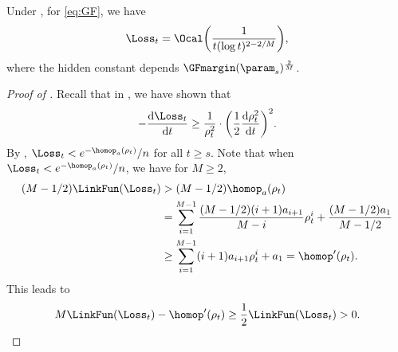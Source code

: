 \begin{lemma}
\label{lem:L-upperbound} 
Under , for \cref{eq:GF}, we have
\[
    \Loss_t = \Ocal \bigg( \frac{1}{t(\log t)^{2-2/M}} \bigg),
\]
where the hidden constant depends $\GFmargin(\param_s)^{\frac{2}{M}}$. 
\end{lemma}
\begin{proof}[Proof of ]
Recall that in , we have shown that 
\[
    - \frac{\mathrm{d} \Loss_t}{\mathrm{d} t} \ge \frac{1}{\rho_t^2} \cdot\bigg(\frac{1}{2} \frac{\mathrm{d}\rho_t^2}{\mathrm{d} t} \bigg)^2.
\]
By , $\Loss_t < e^{-\homop_a(\rho_t)}/n$ for all $t\ge s$.  Note that when $\Loss_t < e^{-\homop_a(\rho_t)}/n$, we have for $M\ge 2$, 
\begin{align*}
    (M-1/2) \LinkFun(\Loss_t) &> (M-1/2) \homop_a(\rho_t) \\ 
    & = \sum_{i=1}^{M-1} \frac{(M-1/2)(i+1)a_{i+1}}{M-i}\rho_t^i + \frac{(M-1/2)a_1}{M-1/2}\\ 
    &\ge \sum_{i=1}^{M-1} (i+1)a_{i+1}\rho_t^i +a_1 = \homop^{\prime}(\rho_t).
\end{align*}
This leads to 
\begin{align}
    \label{eq:v_t log lb}
    M \LinkFun(\Loss_t) - \homop^{\prime}(\rho_t)   \ge \frac{1}{2}\LinkFun(\Loss_t) >0.
\end{align}


\end{proof}
